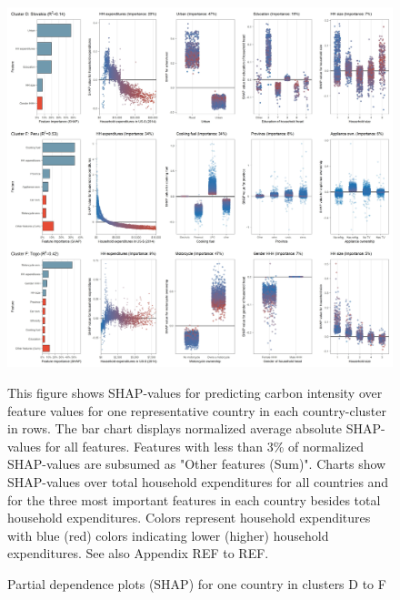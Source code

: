 \documentclass[12pt, a4paper]{article}
\newenvironment{subcaption}
{\strut
\vspace{-5pt}
\begin{minipage}[b]{0.9\textwidth}
  \hspace*{-\parindent}
  \footnotesize}
 {\end{minipage}}
\begin{document}
\begin{figure}[ht!]
    \centering
    \includegraphics[width=15.5 cm]{Figure 5/Figures_joint_2}
    \caption{Partial dependence plots (SHAP) for one country in clusters D to F}
    \label{fig:fig_5_2}
    \begin{subcaption}
    This figure shows SHAP-values for predicting carbon intensity over feature values for one representative country in each country-cluster in rows. The bar chart displays normalized average absolute SHAP-values for all features. Features with less than 3\% of normalized SHAP-values are subsumed as "Other features (Sum)". Charts show SHAP-values over total household expenditures for all countries and for the three most important features in each country besides total household expenditures. Colors represent household expenditures with blue (red) colors indicating lower (higher) household expenditures. See also Appendix REF to REF.
    \end{subcaption}
\end{figure}
\end{document}
